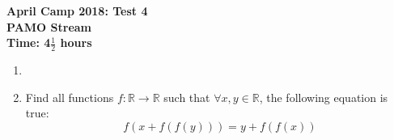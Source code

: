 \documentclass[a4paper,12pt]{article}
\begin{document}
\setcounter{page}{1}

\begin{center}
	\textbf{April Camp 2018: Test 4}\\
	\textbf{PAMO Stream}\\
	\textbf{Time: 4$\frac{1}{2}$ hours}
\end{center}

\begin{enumerate}
\vspace{0.2cm}

\item 

\item %
Find all functions $f: \mathbb{R}\to \mathbb{R}$ such that $\forall x,y \in \mathbb{R}$, the following equation is true:
\[f(x+f(f(y))) = y+f(f(x))\]

\end{enumerate}
\end{document}
